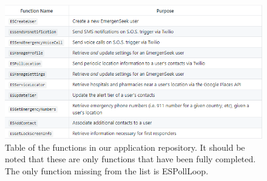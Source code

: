 \documentclass[10pt, a4paper]{article}
\begin{document}
\begin{figure}[H]
\begin{center}
  \includegraphics[scale=1.2]{code-screenshots/func-table.PNG}
  \caption{Table of the functions in our application repository. It should be noted that these are only functions that have been fully completed. The only function missing from the list is ESPollLoop.}
\end{center}
\end{figure}
\end{document}
